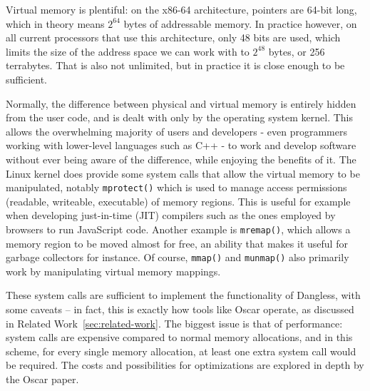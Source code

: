 Virtual memory is plentiful: on the x86-64 architecture, pointers are 64-bit long, which in theory means $2^{64}$ bytes of addressable memory. In practice however, on all current processors that use this architecture, only 48 bits are used, which limits the size of the address space we can work with to $2^{48}$ bytes, or 256 terrabytes. That is also not unlimited, but in practice it is close enough to be sufficient. 

Normally, the difference between physical and virtual memory is entirely hidden from the user code, and is dealt with only by the operating system kernel. This allows the overwhelming majority of users and developers - even programmers working with lower-level languages such as C++ - to work and develop software without ever being aware of the difference, while enjoying the benefits of it. The Linux kernel does provide some system calls that allow the virtual memory to be manipulated, notably \lstinline!mprotect()! which is used to manage access permissions (readable, writeable, executable) of memory regions. This is useful for example when developing just-in-time (JIT) compilers such as the ones employed by browsers to run JavaScript code. Another example is \lstinline!mremap()!, which allows a memory region to be moved almost for free, an ability that makes it useful for garbage collectors for instance. Of course,  \lstinline!mmap()! and \lstinline!munmap()! also primarily work by manipulating virtual memory mappings.

These system calls are sufficient to implement the functionality of Dangless, with some caveats -- in fact, this is exactly how tools like Oscar operate, as discussed in Related Work~\ref{sec:related-work}. The biggest issue is that of performance: system calls are expensive compared to normal memory allocations, and in this scheme, for every single memory allocation, at least one extra system call would be required. The costs and possibilities for optimizations are explored in depth by the Oscar paper.


